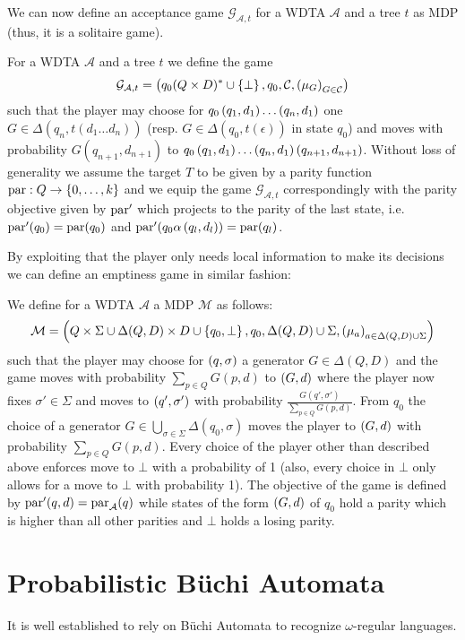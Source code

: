 We can now define an acceptance game $\mathcal{G}_{\mathcal{A}, t}$ for a
\ac{WDTA} $\mathcal{A}$ and a tree $t$ as \ac{MDP} (thus, it is a solitaire
game).
\begin{definition}
  For a \ac{WDTA} $\mathcal{A}$ and a tree $t$ we define the game
  \begin{equation}
    \mathcal{G}_{\mathcal{A}, t} = \left(q_{0}(Q\times D)^{*}\cup\left\{\bot\right\},
    q_{0}, \mathcal{C}, \left(\mu_{G}\right)_{G\in\mathcal{C}}\right)
  \end{equation}
  such that the player may choose for
  $q_{0}\left(q_{1}, d_{1}\right)\dots\left(q_{n}, d_{1}\right)$ one
  $G\in\Delta(q_{n}, t(d_{1}\dots d_{n}))$ (resp.
  $G\in\Delta(q_{0}, t(\epsilon))$ in state $q_{0}$)
  and moves with probability $G(q_{n+1}, d_{n+1})$ to
  $q_{0}\left(q_{1}, d_{1}\right)\dots\left(q_{n}, d_{1}\right)\left(q_{n+1}, d_{n+1}\right)$.
  Without loss of generality we assume the target $T$ to be given by a parity
  function $\operatorname{par}:Q\rightarrow \left\{0,\dots, k\right\}$ and we equip the game
  $\mathcal{G}_{\mathcal{A}, t}$ correspondingly with the parity objective given
  by $\operatorname{par}'$ which projects to the parity of the last state, i.e.
  $\operatorname{par}'(q_0) = \operatorname{par}(q_0)$ and $\operatorname{par}'(q_0\alpha\left(q_{l}, d_{l}\right)) = \operatorname{par}(q_{l})$.
\end{definition}
By exploiting that the player only needs local information to make its
decisions we can define an emptiness game in similar fashion:
\begin{definition}
  We define for a \ac{WDTA} $\mathcal{A}$ a \ac{MDP} $\mathcal{M}$ as follows:
  \begin{equation}
    \mathcal{M} = \left(Q\times\Sigma\cup\Delta(Q, D)\times D\cup\left\{q_{0},\bot\right\},
    q_{0}, \Delta(Q, D)\cup\Sigma, \left(\mu_a\right)_{a\in\Delta(Q, D)\cup\Sigma}\right)
  \end{equation}
  such that the player may choose for $\left(q,\sigma\right)$ a generator
  $G\in\Delta(Q, D)$ and the game moves with probability
  $\sum\limits_{p\in Q}G(p, d)$ to $\left(G, d\right)$ where the player now fixes
  $\sigma'\in\Sigma$ and moves to $\left(q', \sigma'\right)$ with probability
  $\frac{G(q',\sigma')}{\sum\limits_{p\in Q}G(p, d)}$. From $q_{0}$ the choice
  of a generator $G\in\bigcup\limits_{\sigma\in\Sigma}\Delta(q_{0}, \sigma)$
  moves the player to $\left(G, d\right)$ with probability
  $\sum\limits_{p\in Q}G(p, d)$.
  Every choice of the player other than described above enforces move to $\bot$
  with a probability of 1 (also, every choice in $\bot$ only allows
  for a move to $\bot$ with probability 1). The objective of the game is
  defined by $\operatorname{par}'(q,d) = \operatorname{par}_{\mathcal{A}}(q)$ while states of the
  form $\left(G, d\right)$ of $q_{0}$ hold a parity which is higher than all other
  parities and $\bot$ holds a losing parity. 
\end{definition}
\section{Probabilistic Büchi Automata}
It is well established to rely on Büchi Automata to recognize $\omega$-regular
languages. 
